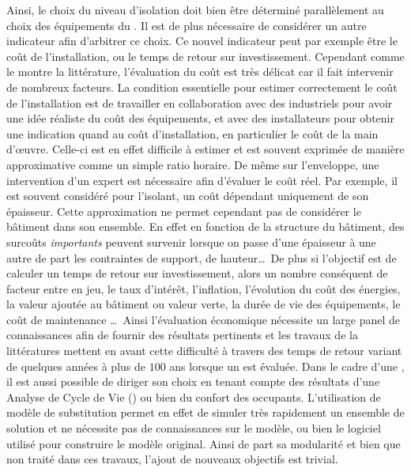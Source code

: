 Ainsi, le choix du niveau d’isolation doit bien être déterminé parallèlement au choix des
équipements du . Il est de plus nécessaire de considérer un autre indicateur afin
d’arbitrer ce choix. Ce nouvel indicateur peut par exemple être le coût de l’installation,
ou le temps de retour sur investissement. Cependant comme le montre la littérature,
l’évaluation du coût est très délicat car il fait intervenir de nombreux facteurs. La
condition essentielle pour estimer correctement le coût de l’installation est de
travailler en collaboration avec des industriels pour avoir une idée réaliste du coût des
équipements, et avec des installateurs pour obtenir une indication quand au coût
d’installation, en particulier le coût de la main d’œuvre. Celle-ci est en effet difficile
à estimer et est souvent exprimée de manière approximative comme un simple ratio horaire.
De même sur l’enveloppe, une intervention d’un expert est nécessaire afin d’évaluer le
coût réel. Par exemple, il est souvent considéré pour l’isolant, un coût dépendant
uniquement de son épaisseur. Cette approximation ne permet cependant pas de considérer le
bâtiment dans son ensemble. En effet en fonction de la structure du bâtiment, des surcoûts
\emph{importants} peuvent survenir lorsque on passe d’une épaisseur à une autre de part
les contraintes de support, de hauteur\dots\ De plus si l’objectif est de calculer un
temps de retour sur investissement, alors un nombre conséquent de facteur entre en jeu, le
taux d’intérêt, l’inflation, l’évolution du coût des énergies, la valeur ajoutée au
bâtiment ou valeur verte, la durée de vie des équipements, le coût de maintenance
\dots\ Ainsi l’évaluation économique nécessite un large panel de connaissances
afin de fournir des résultats pertinents et les travaux de la littératures mettent en
avant cette difficulté à travers des temps de retour variant de quelques années à plus de
$100$ ans lorsque un  est évaluée.
Dans le cadre d’une , il est aussi possible de diriger son choix en tenant
compte des résultats d’une Analyse de Cycle de Vie () ou bien du confort des occupants.
L’utilisation de modèle de substitution permet en effet de simuler très rapidement
un ensemble de solution et ne nécessite pas de connaissances sur le modèle, ou bien le
logiciel utilisé pour construire le modèle original. Ainsi de part sa modularité
et bien que non traité dans ces travaux, l’ajout de nouveaux objectifs est trivial.


